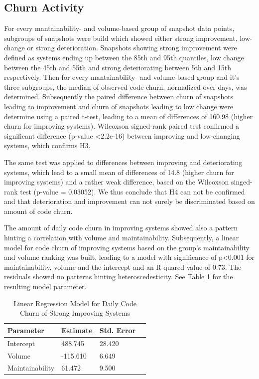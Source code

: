 \subsection{Churn Activity}
For every mantainability- and volume-based group of snapshot data points, subgroups of snapshots were build which showed either strong improvement, low-change or strong deterioration. Snapshots showing strong improvement were defined as systems ending up between the 85th and 95th quantiles, low change between the 45th and 55th and strong deteriorating between 5th and 15th respectively.
Then for every mantainability- and volume-based group and it's three subgroups, the median of observed code churn, normalized over days, was determined. Subsequently the paired difference between churn of snapshots leading to improvement and churn of snapshots leading to low change were determine using a paired t-test, leading to a mean of differences of 160.98 (higher churn for improving systems). Wilcoxson signed-rank paired test confirmed a significant difference (p-value \textless 2.2e-16) between improving and low-changing systems, which confirms H3. 

The same test was applied to differences between improving and deteriorating systems, which lead to a small mean of differences of 14.8 (higher churn for improving systems) and a rather weak difference, based on the Wilcoxson singed-rank test (p-value = 0.03052). We thus conclude that H4 can not be confirmed and that deterioration and improvement can not surely be discriminated based on amount of code churn.

The amount of daily code churn in improving systems showed also a pattern hinting a correlation with volume and maintainability. Subsequently, a linear model for code churn of improving systems based on the group's maintainability and volume ranking was built, leading to a model with significance of p\textless0.001 for maintainability, volume and the intercept and an R-quared value of 0.73. The residuals showed no patterns hinting heteroscedesticity. See Table \ref{results_churn} for the resulting model parameter.
\begin{table}[htbp!]
\centering
\caption{Linear Regression Model for Daily Code Churn of Strong Improving Systems}
\begin{tabular}{l  l  l p{1.2cm}}
  \hline			
  Parameter & Estimate & Std. Error\\ \hline
  Intercept & 488.745 & 28.420\\ 
  Volume & -115.610 & 6.649\\ 
  Maintainability & 61.472 & 9.500\\ 
\end{tabular}
\label{results_churn}
\end{table}
